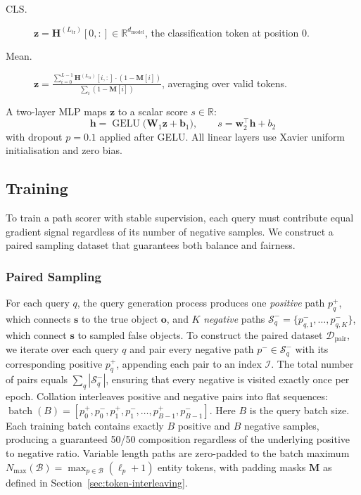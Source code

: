 \documentclass[runningheads]{llncs}
\begin{document}
\begin{description}
  \item[CLS.] $\mathbf{z} = \mathbf{H}^{(L_{\text{tr}})}[0, :] \in \mathbb{R}^{d_{\text{model}}}$, the classification token at position 0.
  \item[Mean.] $\mathbf{z} = \frac{\sum_{i=0}^{L-1} \mathbf{H}^{(L_{\text{tr}})}[i, :] \cdot (1 - \mathbf{M}[i])}{\sum_i (1 - \mathbf{M}[i])}$, averaging over valid tokens.
\end{description}

A two-layer MLP maps $\mathbf{z}$ to a scalar score $s \in \mathbb{R}$:
\begin{equation}
  \mathbf{h} = \operatorname{GELU}\bigl(\mathbf{W}_1 \mathbf{z} + \mathbf{b}_1\bigr),
  \qquad
  s = \mathbf{w}_2^{\top} \mathbf{h} + b_2
  \label{eq:readout}
\end{equation}
with dropout $p = 0.1$ applied after GELU.
All linear layers use Xavier
uniform initialisation and zero bias.

\subsection{Training}

\label{sec:training}

To train a path scorer with stable supervision, each query must contribute equal gradient
signal regardless of its number of negative samples.
We construct a paired sampling
dataset that guarantees both balance and fairness.
\subsubsection{Paired Sampling}

\label{sec:paired-sampling}

For each query $q$, the query generation process produces one
\textit{positive} path $p^+_q$, which connects $\mathbf{s}$ to the
true object $\mathbf{o}$, and $K$ \textit{negative} paths
$\mathcal{S}^-_q = \{p^-_{q,1}, \ldots, p^-_{q,K}\}$, which connect
$\mathbf{s}$ to sampled false objects. To construct the paired
dataset $\mathcal{D}_{\text{pair}}$, we iterate over each query $q$
and pair every negative path $p^- \in \mathcal{S}_q^-$ with its
corresponding positive $p^+_q$, appending each pair to an index
$\mathcal{I}$. The total number of pairs equals $\sum_q
|\mathcal{S}_q^-|$, ensuring that every negative is visited exactly
once per epoch. Collation interleaves positive and negative pairs
into flat sequences:
$\operatorname{batch}(B) = [p^+_0, p^-_0, p^+_1, p^-_1, \ldots, p^+_{B-1}, p^-_{B-1}]$.
Here $B$ is the query batch size. Each training batch contains
exactly $B$ positive and $B$ negative samples, producing a guaranteed
50/50 composition regardless of the underlying positive to negative
ratio. Variable length paths are zero-padded to the batch maximum
$N_{\max}(\mathcal{B}) = \max_{p \in \mathcal{B}} (\ell_p + 1)$
entity tokens, with padding masks $\mathbf{M}$ as defined in
Section~\ref{sec:token-interleaving}.
\end{document}

